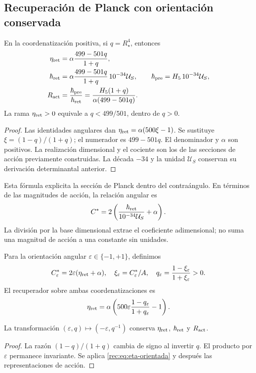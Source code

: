 \subsection{Recuperación de Planck con orientación conservada}

\begin{theorem}
\label{rec:thm:accion}
En la coordenatización positiva, si \(q=R_\star^4\), entonces
\begin{align}
 \eta_{\rm ret}&=\alpha\frac{499-501q}{1+q},\label{rec:eq:eta-radio}\\
 \hbar_{\rm ret}&=\alpha\frac{499-501q}{1+q}\,10^{-34}\mathcal U_S,
 \qquad\hbar_{\rm pre}=H_5\,10^{-34}\mathcal U_S,\label{rec:eq:planck-radio}\\
 R_{\rm act}&=\frac{\hbar_{\rm pre}}{\hbar_{\rm ret}}
 =\frac{H_5(1+q)}{\alpha(499-501q)}.\label{rec:eq:ratio-radio}
\end{align}
La rama \(\eta_{\rm ret}>0\) equivale a \(q<499/501\), dentro de \(q>0\).
\end{theorem}
\begin{proof}
Las identidades angulares dan \(\eta_{\rm ret}=\alpha(500\xi-1)\). Se sustituye \(\xi=(1-q)/(1+q)\); el numerador es \(499-501q\). El denominador y \(\alpha\) son positivos. La realización dimensional y el cociente son los de las secciones de acción previamente construidas. La década \(-34\) y la unidad \(\mathcal U_S\) conservan su derivación determinantal anterior.
\end{proof}

Esta fórmula explicita la sección de Planck dentro del contraángulo. En términos de las magnitudes de acción, la relación angular es
\[
 C^*=2\left(\frac{\hbar_{\rm ret}}{10^{-34}\mathcal U_S}+\alpha\right).
\]
La división por la base dimensional extrae el coeficiente adimensional; no suma una magnitud de acción a una constante sin unidades.

Para la orientación angular \(\varepsilon\in\{-1,+1\}\), definimos
\[
 C^*_{\varepsilon}=2\varepsilon(\eta_{\rm ret}+\alpha),\quad
 \xi_\varepsilon=C^*_{\varepsilon}/A,\quad
 q_\varepsilon=\frac{1-\xi_\varepsilon}{1+\xi_\varepsilon}>0.
\]
El recuperador sobre ambas coordenatizaciones es
\begin{equation}
 \eta_{\rm ret}=\alpha\left(500\varepsilon
        \frac{1-q_\varepsilon}{1+q_\varepsilon}-1\right).
 \label{rec:eq:eta-orientada}
\end{equation}

\begin{corollary}
La transformación \((\varepsilon,q)\mapsto(-\varepsilon,q^{-1})\) conserva \(\eta_{\rm ret}\), \(\hbar_{\rm ret}\) y \(R_{\rm act}\).
\end{corollary}
\begin{proof}
La razón \((1-q)/(1+q)\) cambia de signo al invertir \(q\). El producto por \(\varepsilon\) permanece invariante. Se aplica \eqref{rec:eq:eta-orientada} y después las representaciones de acción.
\end{proof}

